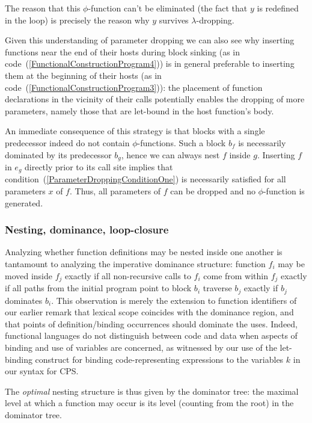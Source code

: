 The reason that this $\phi$-function can't be eliminated (the fact
that $y$ is redefined in the loop) is precisely the reason why $y$
survives $\lambda$-dropping.

Given this understanding of parameter dropping we can also see why
inserting functions near the end of their hosts during block sinking
(as in code~(\ref{FunctionalConstructionProgram4})) is in general
preferable to inserting them at the beginning of their hosts (as in
code~(\ref{FunctionalConstructionProgram3})): the placement of
function declarations in the vicinity of their calls potentially
enables the dropping of more parameters, namely those that are
let-bound in the host function's body.

An immediate consequence of this strategy is that blocks with a single
predecessor indeed do not contain $\phi$-functions. Such a block $b_f$
is necessarily dominated by its predecessor $b_g$, hence we can always
nest $f$ inside $g$. Inserting $f$ in $e_g$ directly prior to its call
site implies that condition~(\ref{ParameterDroppingConditionOne}) is
necessarily satisfied for all parameters $x$ of $f$. Thus, all
parameters of $f$ can be dropped and no $\phi$-function is generated.

\subsubsection{Nesting, dominance, loop-closure}
\label{section:semantics:loopclosure}
Analyzing whether function definitions may be nested inside one
another is tantamount to analyzing the imperative dominance structure:
function $f_i$ may be moved inside $f_j$ exactly if all non-recursive
calls to $f_i$ come from within $f_j$ exactly if all paths from the
initial program point to block $b_i$ traverse $b_j$ exactly if $b_j$
dominates $b_i$.  This observation is merely the extension to function
identifiers of our earlier remark that lexical scope coincides with
the dominance region, and that points of definition/binding
occurrences should dominate the uses. Indeed, functional languages do
not distinguish between code and data when aspects of binding and use
of variables are concerned, as witnessed by our use of the let-binding
construct for binding code-representing expressions to the variables
$k$ in our syntax for CPS. 

The \emph{optimal} nesting structure is thus given by the dominator
tree: the maximal level at which a function may occur is its level
(counting from the root) in the dominator tree.

